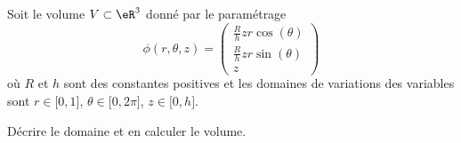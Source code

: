 
\begin{exercice}\label{exoOutilsMath-0116}

    Soit le volume $V\subset\eR^3$ donné par le paramétrage
    \begin{equation}
        \phi(r,\theta,z)=\begin{pmatrix}
            \frac{ R }{ h }zr\cos(\theta)    \\ 
            \frac{ R }{ h }zr\sin(\theta)    \\ 
            z    
        \end{pmatrix}
    \end{equation}
    où $R$ et $h$ sont des constantes positives et les domaines de variations des variables sont $r\in\mathopen[ 0 , 1 \mathclose]$, $\theta\in\mathopen[ 0 , 2\pi \mathclose]$, $z\in\mathopen[ 0 , h \mathclose]$.

    Décrire le domaine et en calculer le volume.

\end{exercice}
